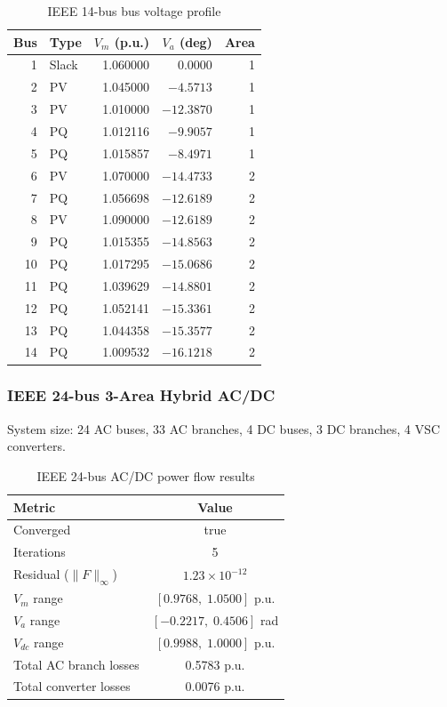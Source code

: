 \documentclass[11pt]{article}
\begin{document}
\begin{table}[h]
\centering
\caption{IEEE 14-bus bus voltage profile}
\label{tab:ieee14_voltage}
\small
\begin{tabular}{r l r r r}
\toprule
Bus & Type & $V_m$ (p.u.) & $V_a$ (deg) & Area \\
\midrule
 1 & Slack & 1.060000 &   0.0000 & 1 \\
 2 & PV    & 1.045000 &  $-4.5713$ & 1 \\
 3 & PV    & 1.010000 & $-12.3870$ & 1 \\
 4 & PQ    & 1.012116 &  $-9.9057$ & 1 \\
 5 & PQ    & 1.015857 &  $-8.4971$ & 1 \\
 6 & PV    & 1.070000 & $-14.4733$ & 2 \\
 7 & PQ    & 1.056698 & $-12.6189$ & 2 \\
 8 & PV    & 1.090000 & $-12.6189$ & 2 \\
 9 & PQ    & 1.015355 & $-14.8563$ & 2 \\
10 & PQ    & 1.017295 & $-15.0686$ & 2 \\
11 & PQ    & 1.039629 & $-14.8801$ & 2 \\
12 & PQ    & 1.052141 & $-15.3361$ & 2 \\
13 & PQ    & 1.044358 & $-15.3577$ & 2 \\
14 & PQ    & 1.009532 & $-16.1218$ & 2 \\
\bottomrule
\end{tabular}
\end{table}

\subsubsection{IEEE 24-bus 3-Area Hybrid AC/DC}
System size: 24 AC buses, 33 AC branches, 4 DC buses, 3 DC branches, 4 VSC converters.

\begin{table}[h]
\centering
\caption{IEEE 24-bus AC/DC power flow results}
\begin{tabular}{l c}
\toprule
Metric & Value \\
\midrule
Converged & true \\
Iterations & 5 \\
Residual ($\|F\|_\infty$) & $1.23 \times 10^{-12}$ \\
$V_m$ range & $[0.9768,\; 1.0500]$ p.u. \\
$V_a$ range & $[-0.2217,\; 0.4506]$ rad \\
$V_{dc}$ range & $[0.9988,\; 1.0000]$ p.u. \\
Total AC branch losses & 0.5783 p.u. \\
Total converter losses & 0.0076 p.u. \\
\bottomrule
\end{tabular}
\end{table}
\end{document}
